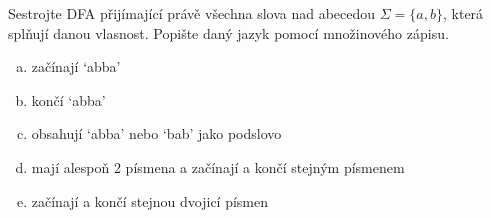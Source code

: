 \documentclass[a4paper,12pt]{amsart}
\begin{document}
\medskip\begin{problem}

    Sestrojte DFA přijímající právě všechna slova nad abecedou $\Sigma=\{a,b\}$, která splňují danou vlasnost. Popište daný jazyk pomocí množinového zápisu.

    \medskip

    \begin{enumerate}[(a)]\setlength\itemsep{12pt}
        \item začínají `abba'
        \item končí `abba'
        \item obsahují `abba' nebo `bab' jako podslovo
        \item mají alespoň 2 písmena a začínají a končí stejným písmenem
        \item začínají a končí stejnou dvojicí písmen
    \end{enumerate}

\end{problem}
\end{document}
